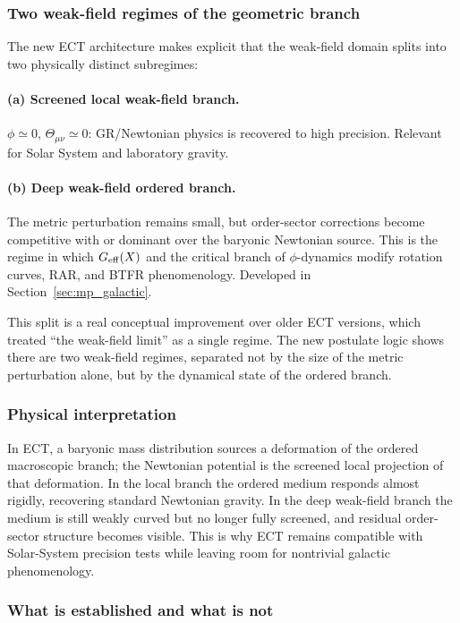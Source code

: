 \subsubsection*{Two weak-field regimes of the geometric branch}

The new ECT architecture makes explicit that the weak-field domain
splits into two physically distinct subregimes:

\paragraph{(a) Screened local weak-field branch.}
$\phi\simeq 0$, $\Theta_{\mu\nu}\simeq 0$: GR/Newtonian physics is
recovered to high precision.
Relevant for Solar System and laboratory gravity.

\paragraph{(b) Deep weak-field ordered branch.}
The metric perturbation remains small, but order-sector corrections
become competitive with or dominant over the baryonic Newtonian source.
This is the regime in which $G_{\rm eff}(X)$ and the critical branch of
$\phi$-dynamics modify rotation curves, RAR, and BTFR phenomenology.
Developed in Section~\ref{sec:mp_galactic}.

This split is a real conceptual improvement over older ECT versions,
which treated ``the weak-field limit'' as a single regime.
The new postulate logic shows there are two weak-field regimes, separated
not by the size of the metric perturbation alone, but by the dynamical
state of the ordered branch.

\subsubsection*{Physical interpretation}

In ECT, a baryonic mass distribution sources a deformation of the
ordered macroscopic branch; the Newtonian potential is the screened local
projection of that deformation.
In the local branch the ordered medium responds almost rigidly, recovering
standard Newtonian gravity.
In the deep weak-field branch the medium is still weakly curved but no
longer fully screened, and residual order-sector structure becomes
visible.
This is why ECT remains compatible with Solar-System precision tests
while leaving room for nontrivial galactic phenomenology.

\subsubsection*{What is established and what is not}

